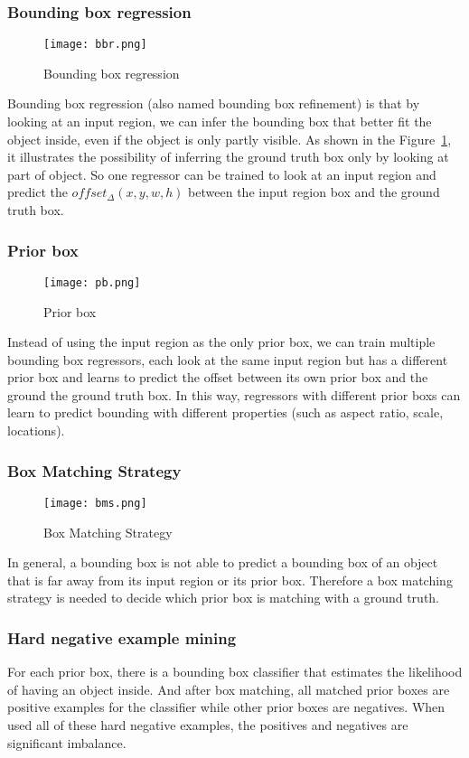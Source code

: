\documentclass[a4paper,12pt,twocolumn]{article}
\begin{document}
\subsubsection*{Bounding box regression}
\begin{figure}[h]
	\centering
	\texttt{[image: bbr.png]}
	\caption{Bounding box regression}\label{bbr}
\end{figure}
\par
Bounding box regression (also named bounding box refinement) is that by looking at an input region, we can infer the bounding box that better fit the object inside, even if the object is only partly visible. As shown in the Figure~\ref{bbr}, it illustrates the possibility of inferring the ground truth box only by looking at part of object. So one regressor can be trained to look at an input region and predict the $offset_\Delta(x,y,w,h)$ between the input region box and the ground truth box.
\subsubsection*{Prior box}
\begin{figure}[h]
	\centering
	\texttt{[image: pb.png]}
	\caption{Prior box}\label{pb}
\end{figure}
\par
Instead of using the input region as the only prior box, we can train multiple bounding box regressors, each look at the same input region but has a different prior box and learns to predict the offset between its own prior box and the ground the ground truth box. In this way, regressors with different prior boxs can learn to predict bounding with different properties (such as aspect ratio, scale, locations).
\subsubsection*{Box Matching Strategy}
\begin{figure}[h]
	\centering
	\texttt{[image: bms.png]}
	\caption{Box Matching Strategy}\label{bms}
\end{figure}
\par
In general, a bounding box is not able to predict a bounding box of an object that is far away from its input region or its prior box. Therefore a box matching strategy is needed to decide which prior box is matching with a ground truth.
\subsubsection*{Hard negative example mining}
For each prior box, there is a bounding box classifier that estimates the likelihood of having an object inside. And after box matching, all matched prior boxes are positive examples for the classifier while other prior boxes are negatives. When used all of these hard negative examples, the positives and negatives are significant imbalance.


\end{document}

